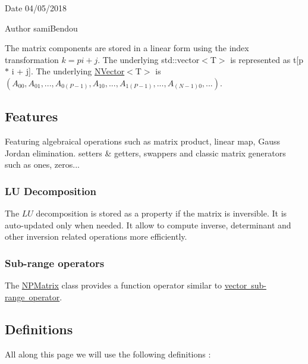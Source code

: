 \begin{DoxyDate}{Date}
04/05/2018 
\end{DoxyDate}
\begin{DoxyAuthor}{Author}
sami\+Bendou
\end{DoxyAuthor}
The matrix components are stored in a linear form using the index transformation $ k = p i + j $. The underlying {\ttfamily std\+::vector$<$T$>$} is represented as {\ttfamily t\mbox{[}p $\ast$ i + j\mbox{]}}. The underlying {\ttfamily \mbox{\hyperlink{class_n_vector}{N\+Vector}}$<$T$>$} is $ (A_{00}, A_{01}, ..., A_{0(P - 1)}, A_{10}, ..., A_{1(P - 1)}, ..., A_{(N-1)0}, ...) $.\hypertarget{class_n_p_matrix_Features}{}\subsection{Features}\label{class_n_p_matrix_Features}
Featuring algebraical operations such as matrix product, linear map, Gauss Jordan elimination. setters \& getters, swappers and classic matrix generators such as ones, zeros...\hypertarget{class_n_p_matrix_LUDecomp}{}\subsubsection{L\+U Decomposition}\label{class_n_p_matrix_LUDecomp}
The $ LU $ decomposition is stored as a property if the matrix is inversible. It is auto-\/updated only when needed. It allow to compute inverse, determinant and other inversion related operations more efficiently.\hypertarget{class_n_p_matrix_FuncOp}{}\subsubsection{Sub-\/range operators}\label{class_n_p_matrix_FuncOp}
The {\ttfamily \mbox{\hyperlink{class_n_p_matrix}{N\+P\+Matrix}}} class provides a function operator similar to \mbox{\hyperlink{class_n_vector_a3ed21b63fd97af9c63bfacb372f733a5}{vector sub-\/range operator}}.\hypertarget{class_n_p_matrix_Definitions}{}\subsection{Definitions}\label{class_n_p_matrix_Definitions}
All along this page we will use the following definitions \+:
